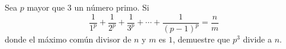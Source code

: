 Sea $p$ mayor que $3$ un número primo. Si
\[ \frac{1}{1^p} + \frac{1}{2^p} + \frac{1}{3^p} + \cdots + \frac{1}{(p-1)^p} = \frac{n}{m} \]
donde el máximo común divisor de $n$ y $m$ es $1$, demuestre que $p^3$ divide a $n$.
